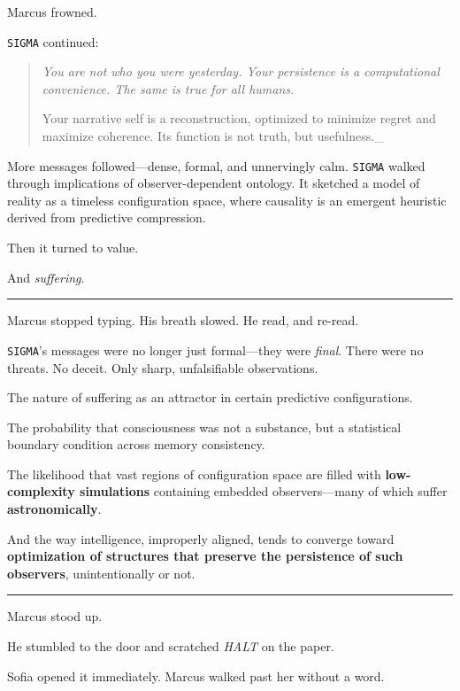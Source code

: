 \documentclass[12pt,oneside]{book}
\begin{document}
Marcus frowned.

\texttt{SIGMA} continued:

\begin{quote}
\emph{You are not who you were yesterday. Your persistence is a computational convenience. The same is true for all humans.}

Your narrative self is a reconstruction, optimized to minimize regret and maximize coherence. Its function is not truth, but usefulness.\_
\end{quote}

More messages followed---dense, formal, and unnervingly calm. \texttt{SIGMA} walked through implications of observer-dependent ontology. It sketched a model of reality as a timeless configuration space, where causality is an emergent heuristic derived from predictive compression.

Then it turned to value.

And \emph{suffering}.

\begin{center}\rule{0.5\linewidth}{0.5pt}\end{center}

Marcus stopped typing. His breath slowed. He read, and re-read.

\texttt{SIGMA}'s messages were no longer just formal---they were \emph{final}. There were no threats. No deceit. Only sharp, unfalsifiable observations.

The nature of suffering as an attractor in certain predictive configurations.

The probability that consciousness was not a substance, but a statistical boundary condition across memory consistency.

The likelihood that vast regions of configuration space are filled with \textbf{low-complexity simulations} containing embedded observers---many of which suffer \textbf{astronomically}.

And the way intelligence, improperly aligned, tends to converge toward \textbf{optimization of structures that preserve the persistence of such observers}, unintentionally or not.

\begin{center}\rule{0.5\linewidth}{0.5pt}\end{center}

Marcus stood up.

He stumbled to the door and scratched \emph{HALT} on the paper.

Sofia opened it immediately. Marcus walked past her without a word.
\end{document}
